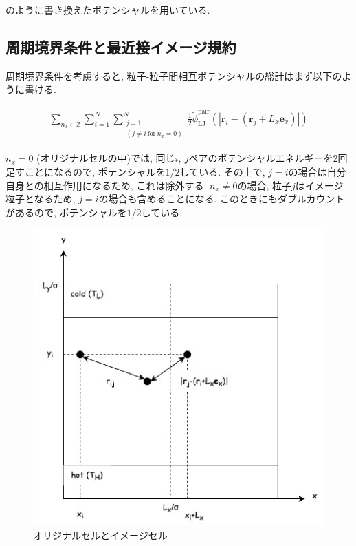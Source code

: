 のように書き換えたポテンシャルを用いている.

\subsection{周期境界条件と最近接イメージ規約}

周期境界条件を考慮すると, 粒子-粒子間相互ポテンシャルの総計はまず以下のように書ける.\cite{MD}

\begin{align}
  \sum_{n_x \in \mathbb{Z}} \sum_{i=1}^{N} \sum_{\substack{j=1 \\ (j \neq i \ \text{for} \ n_{x} = 0)}}^{N} \frac{1}{2} \tilde{\phi}_{\text{LJ}}^{\text{pair}}(|\bm{r}_i -(\bm{r}_j + L_x \bm{e}_x)|) 
\end{align}

$n_x = 0$ (オリジナルセルの中)では, 同じ$i,\ j$ペアのポテンシャルエネルギーを2回足すことになるので, ポテンシャルを$1/2$している. その上で, $j = i$の場合は自分自身との相互作用になるため, これは除外する. $n_x \neq 0$の場合, 粒子$j$はイメージ粒子となるため, $j=i$の場合も含めることになる. このときにもダブルカウントがあるので, ポテンシャルを$1/2$している. 

\begin{figure}[H]
  \centering
  \caption{オリジナルセルとイメージセル}
  \label{fig:system_periodic}
  \includegraphics[scale=0.7]{image/system_periodic.jpg}
\end{figure}

